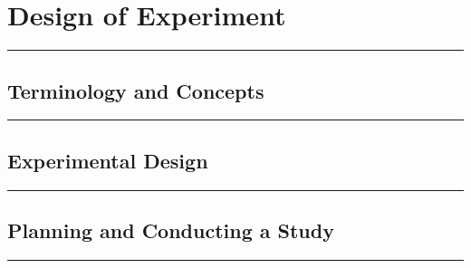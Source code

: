 \section{Design of Experiment}
\noindent\rule[\linienAbstand]{\linewidth}{\linienDickeDick}

\subsection{Terminology and Concepts}
\noindent\rule[\linienAbstand]{\linewidth}{\linienDicke}

\subsection{Experimental Design}
\noindent\rule[\linienAbstand]{\linewidth}{\linienDicke}

\subsection{Planning and Conducting a Study}
\noindent\rule[\linienAbstand]{\linewidth}{\linienDicke}
